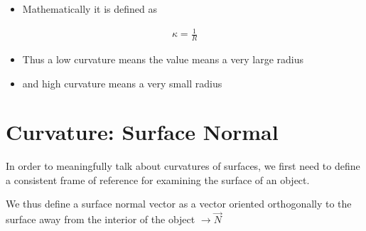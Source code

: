 \documentclass[letterpaper,10pt,english]{sphinxmanual}
\begin{document}
\sphinxAtStartPar
{}
\begin{itemize}
\item {} 
\sphinxAtStartPar
Mathematically it is defined as

\end{itemize}
\begin{equation*}
\begin{split} \kappa = \frac{1}{R} \end{split}
\end{equation*}\begin{itemize}
\item {} 
\sphinxAtStartPar
Thus a low curvature means the value means a very large radius

\item {} 
\sphinxAtStartPar
and high curvature means a very small radius

\end{itemize}


\section{Curvature: Surface Normal}
\label{\detokenize{06-AdvancedShapeAndTexture:curvature-surface-normal}}
\sphinxAtStartPar
In order to meaningfully talk about curvatures of surfaces, we first need to define a consistent frame of reference for examining the surface of an object.

\sphinxAtStartPar
We thus define a surface normal vector as a vector oriented orthogonally to the surface away from the interior of the object \(\rightarrow \vec{N}\)
\end{document}
